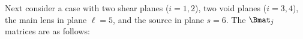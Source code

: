 Next consider a case with two shear planes ($i = 1,2$), two void planes ($i = 3,4$), the main lens in plane $\ell = 5$, and the source in plane $s = 6$. The $\Bmat_j$ matrices are as follows: